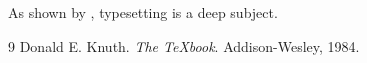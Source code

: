 \documentclass{article}
\begin{document}
As shown by \cite{knuth1984}, typesetting is a deep subject.

\begin{thebibliography}{9}
Donald E. Knuth. \textit{The \TeX{}book}. Addison-Wesley, 1984.
\end{thebibliography}
\end{document}
